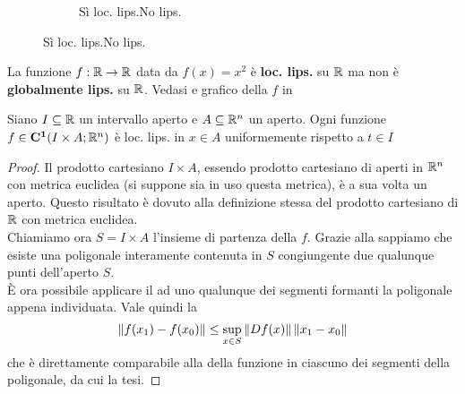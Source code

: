 \begin{example}
\begin{figure}[H]
\begin{subfigure}{.24\textwidth}
{
			}
			\caption{Sì loc. lips.\newline No lips.}
		\end{subfigure}
	\end{figure}
\end{example}
\begin{example}
	La funzione $f:\mathbb{R}\to \mathbb{R}$ data da $f(x)=x^2$ è \textbf{loc. lips.} su $\mathbb{R}$ ma non è \textbf{globalmente lips.} su $\mathbb{R}$. Vedasi  e grafico della $f$ in 
\end{example}

\begin{proposition}
	\label{prop:fc1_loc_lips}
	Siano $I\subseteq \mathbb{R}$ un intervallo aperto e $A\subseteq \mathbb{R}^n$ un aperto. Ogni funzione $f\in\mathbf{C^{1}}(I\times A;\mathbb{R}^n)$ è loc. lips. in $x\in A$ uniformemente rispetto a $t\in I$
	\begin{proof}
		Il prodotto cartesiano $I\times A$, essendo prodotto cartesiano di aperti in $\mathbb{R}^n$ con metrica euclidea (si suppone sia in uso questa metrica), è a sua volta un aperto. Questo risultato è dovuto alla definizione stessa del prodotto cartesiano di $\mathbb{R}$ con metrica euclidea.\\
		Chiamiamo ora $S=I\times A$ l'insieme di partenza della $f$. Grazie alla  sappiamo che esiste una poligonale interamente contenuta in $S$ congiungente due qualunque punti dell'aperto $S$.\\
		È ora possibile applicare il  ad uno qualunque dei segmenti formanti la poligonale appena individuata. Vale quindi la
		\[\left\|f(x_1)-f(x_0)\right\| \leq \sup\limits_{x\in S}\left\|Df(x)\right\|\left\|x_1-x_0\right\|\]
		che è direttamente comparabile alla  della funzione in ciascuno dei segmenti della poligonale, da cui la tesi.
	\end{proof}
\end{proposition}

